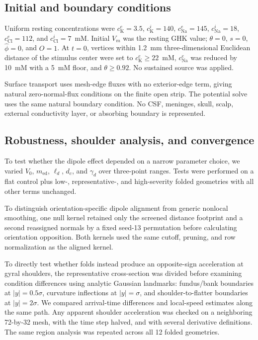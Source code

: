 \documentclass[12pt]{article}
\begin{document}
\subsection{Initial and boundary conditions}

Uniform resting concentrations were $c_{\mathrm K}^{e}=3.5$, $c_{\mathrm K}^{i}=140$, $c_{\mathrm{Na}}^{e}=145$, $c_{\mathrm{Na}}^{i}=18$, $c_{\mathrm{Cl}}^{e}=112$, and $c_{\mathrm{Cl}}^{i}=7$~mM. Initial $V_m$ was the resting GHK value; $\theta=0$, $s=0$, $\hat\phi=0$, and $O=1$. At $t=0$, vertices within 1.2~mm three-dimensional Euclidean distance of the stimulus center were set to $c_{\mathrm K}^{e}\ge22$~mM, $c_{\mathrm{Na}}^{e}$ was reduced by 10~mM with a 5~mM floor, and $\theta\ge0.92$. No sustained source was applied.

Surface transport uses mesh-edge fluxes with no exterior-edge term, giving natural zero-normal-flux conditions on the finite open strip. The potential solve uses the same natural boundary condition. No CSF, meninges, skull, scalp, external conductivity layer, or absorbing boundary is represented.

\subsection{Robustness, shoulder analysis, and convergence}

To test whether the dipole effect depended on a narrow parameter choice, we varied $V_0$, $m_{\mathrm{ed}}$, $\ell_d$, $d_c$, and $\gamma_d$ over three-point ranges. Tests were performed on a flat control plus low-, representative-, and high-severity folded geometries with all other terms unchanged.

To distinguish orientation-specific dipole alignment from generic nonlocal smoothing, one null kernel retained only the screened distance footprint and a second reassigned normals by a fixed seed-13 permutation before calculating orientation opposition. Both kernels used the same cutoff, pruning, and row normalization as the aligned kernel.

To directly test whether folds instead produce an opposite-sign acceleration at gyral shoulders, the representative cross-section was divided before examining condition differences using analytic Gaussian landmarks: fundus/bank boundaries at $|y|=0.5\sigma$, curvature inflections at $|y|=\sigma$, and shoulder-to-flatter boundaries at $|y|=2\sigma$. We compared arrival-time differences and local-speed estimates along the same path. Any apparent shoulder acceleration was checked on a neighboring 72-by-32 mesh, with the time step halved, and with several derivative definitions. The same region analysis was repeated across all 12 folded geometries.
\end{document}
